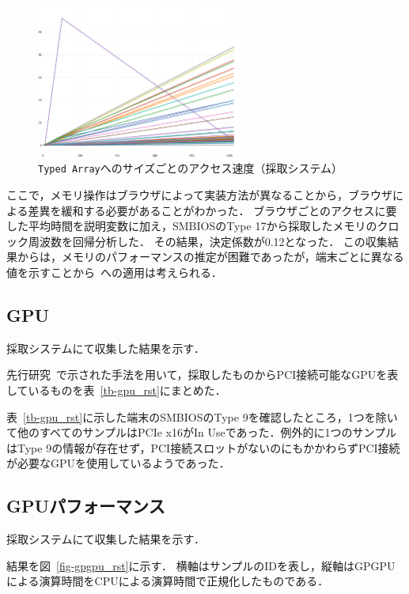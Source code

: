 \begin{figure}[H]
    \centering
    \includegraphics[width=0.6\textwidth,pagebox=cropbox]{fig/memory_rst.pdf}
    \caption{\texttt{Typed Array}へのサイズごとのアクセス速度（採取システム）}
    \label{fig-memory_rst}
\end{figure}

ここで，メモリ操作はブラウザによって実装方法が異なることから，ブラウザによる差異を緩和する必要があることがわかった．
ブラウザごとのアクセスに要した平均時間を説明変数に加え，SMBIOSのType 17から採取したメモリのクロック周波数を回帰分析した．
その結果，決定係数が0.12となった．
この収集結果からは，メモリのパフォーマンスの推定が困難であったが，端末ごとに異なる値を示すことから\fp~への適用は考えられる．

\subsection{GPU}
採取システムにて収集した結果を示す．

先行研究~\cite{mowery2012pixel}で示された手法を用いて，採取したものからPCI接続可能なGPUを表しているものを表~\ref{tb-gpu_rst}にまとめた．



表~\ref{tb-gpu_rst}に示した端末のSMBIOSのType 9を確認したところ，1つを除いて他のすべてのサンプルはPCIe x16がIn Useであった．例外的に1つのサンプルはType 9の情報が存在せず，PCI接続スロットがないのにもかかわらずPCI接続が必要なGPUを使用しているようであった．

\subsection{GPUパフォーマンス}
採取システムにて収集した結果を示す．

結果を図~\ref{fig-gpgpu_rst}に示す．
横軸はサンプルのIDを表し，縦軸はGPGPUによる演算時間をCPUによる演算時間で正規化したものである．

